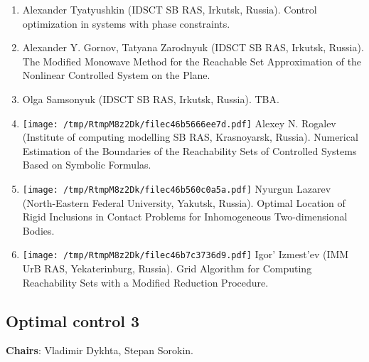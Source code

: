 \documentclass[
]{article}
\providecommand{\tightlist}{%
  \setlength{\itemsep}{0pt}\setlength{\parskip}{0pt}}
\begin{document}
\begin{enumerate}
\def\labelenumi{\arabic{enumi}.}
\tightlist
\item
  Alexander Tyatyushkin (IDSCT SB RAS, Irkutsk, Russia). Control
  optimization in systems with phase constraints.
\item
  Alexander Y. Gornov, Tatyana Zarodnyuk (IDSCT SB RAS, Irkutsk,
  Russia). The Modiﬁed Monowave Method for the Reachable Set
  Approximation of the Nonlinear Controlled System on the Plane.
\item
  Olga Samsonyuk (IDSCT SB RAS, Irkutsk, Russia). TBA.
\item
  \protect\texttt{[image: /tmp/RtmpM8z2Dk/filec46b5666ee7d.pdf]}
  Alexey N. Rogalev (Institute of computing modelling SB RAS,
  Krasnoyarsk, Russia). Numerical Estimation of the Boundaries of the
  Reachability Sets of Controlled Systems Based on Symbolic Formulas.
\item
  \protect\texttt{[image: /tmp/RtmpM8z2Dk/filec46b560c0a5a.pdf]}
  Nyurgun Lazarev (North-Eastern Federal University, Yakutsk, Russia).
  Optimal Location of Rigid Inclusions in Contact Problems for
  Inhomogeneous Two-dimensional Bodies.
\item
  \protect\texttt{[image: /tmp/RtmpM8z2Dk/filec46b7c3736d9.pdf]}
  Igor' Izmest'ev (IMM UrB RAS, Yekaterinburg, Russia). Grid Algorithm
  for Computing Reachability Sets with a Modified Reduction Procedure.
\end{enumerate}

\hypertarget{oc3}{%
\subsection{Optimal control 3}\label{oc3}}

\textbf{Chairs}: Vladimir Dykhta, Stepan Sorokin.
\end{document}
